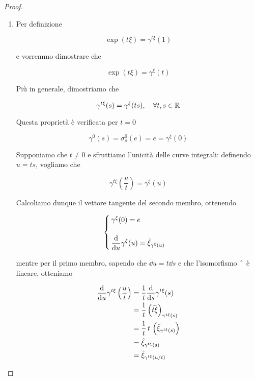 \begin{proof}
\begin{enumerate}
		\item Per definizione
		
		\begin{equation}
			\exp(t \xi) = \gamma^{t \xi}(1)
		\end{equation}
	
		e vorremmo dimostrare che
		
		\begin{equation}
			\exp(t \xi) = \gamma^{\xi}(t)
		\end{equation}
	
		Più in generale, dimostriamo che
		
		\begin{equation}
			\gamma^{t \xi}(s) = \gamma^{\xi}(t s) \qcomma \forall t,s \in \R
		\end{equation}
	
		Questa proprietà è verificata per $ t = 0 $
		
		\begin{equation}
			\gamma^{0}(s) = \sigma_{s}^{0}(e) %
			= e %
			= \gamma^{\xi}(0)
		\end{equation}
	
		Supponiamo che $ t \neq 0 $ e sfruttiamo l'unicità delle curve integrali: definendo $ u = t s $, vogliamo che
		
		\begin{equation}
			\gamma^{t \xi} \left( \dfrac{u}{t} \right) = \gamma^{\xi}(u)
		\end{equation}
		
		Calcoliamo dunque il vettore tangente del secondo membro, ottenendo
		
		\begin{equation}
			\begin{cases}
				\gamma^{\xi}(0) = e \\\\
				\ddv{u} \gamma^{\xi}(u) = \hat{\xi}_{\gamma^{\xi}(u)}
			\end{cases}
		\end{equation}
	
		mentre per il primo membro, sapendo che $ \dd{u} = t \dd{s} $ e che l'isomorfismo $ \; \hat{} \; $ è lineare, otteniamo
		
		\begin{align}
			\begin{split}
				\dv{u} \gamma^{t \xi} \left( \dfrac{u}{t} \right) &= \dfrac{1}{t} \dv{s} \gamma^{t \xi}(s) \\
				&= \dfrac{1}{t} \left( \widehat{t \xi} \right)_{\gamma^{t \xi}(s)} \\
				&= \dfrac{1}{t} \, t \, \left( \hat{\xi}_{\gamma^{t \xi}(s)} \right) \\
				&= \hat{\xi}_{\gamma^{t \xi}(s)} \\
				&= \hat{\xi}_{\gamma^{t \xi}(u/t)}
			\end{split}
		\end{align}
	

\end{enumerate}
\end{proof}
